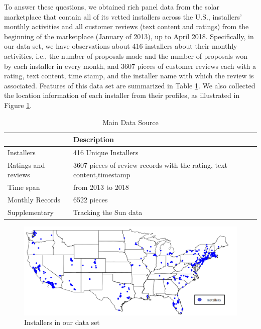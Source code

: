 \documentclass[msom,blindrev]{informs3}
\begin{document}
To answer these questions, we obtained rich panel data from the solar marketplace that contain all of its vetted installers across the U.S., installers' monthly activities and all customer reviews (text content and ratings) from the beginning of the marketplace (January of 2013), up to April 2018. Specifically, in our data set, we have observations about 416 installers about their monthly activities, i.e., the number of proposals made and the number of proposals won by each installer in every month, and 3607 pieces of customer reviews each with a rating, text content, time stamp, and the installer name with which the review is associated. Features of this data set are summarized in Table \ref{brief_data_desc}. We also collected the location information of each installer from their profiles, as illustrated in Figure \ref{fig:nationalinstallers}.

\begin{table}[]
\centering
\begin{tabular}{@{}ll@{}}
\toprule
           & Description           \\ \midrule
Installers & 416 Unique Installers \\
Ratings and reviews & 3607 pieces of review records with the rating, text content,timestamp \\
Time span  & from 2013 to 2018     \\
Monthly Records & 6522 pieces \\
Supplementary & Tracking the Sun data \\
\bottomrule
\end{tabular}
\caption{Main Data Source}
\label{brief_data_desc}
\end{table}






\begin{figure}
	\centering
	\includegraphics[width=1.1\linewidth]{national_installers.png}
	\caption{Installers in our data set}
	\label{fig:nationalinstallers}
\end{figure}
\end{document}
